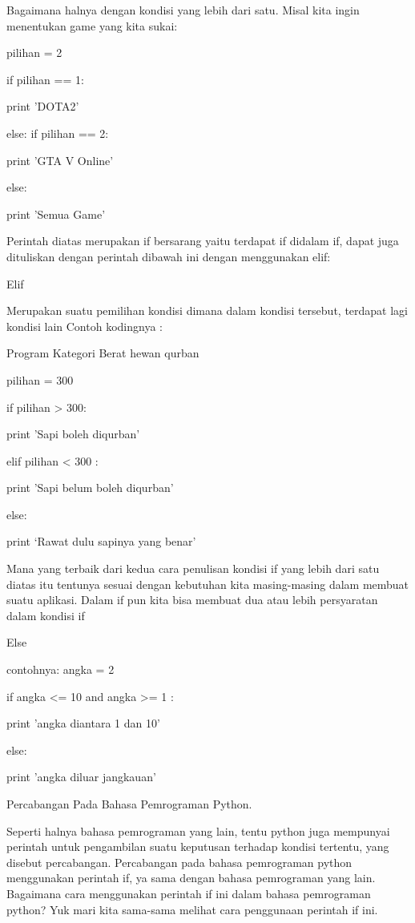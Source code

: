 Bagaimana halnya dengan kondisi yang lebih dari satu. Misal kita ingin menentukan game yang kita sukai: 
 

pilihan = 2 
 

if pilihan == 1: 
 

        print 'DOTA2' 
 

else:
        if pilihan == 2: 
 

                print 'GTA V Online' 
 

        else: 
 

                print 'Semua Game' 
 

Perintah diatas merupakan if bersarang yaitu terdapat if didalam if, dapat juga dituliskan dengan perintah dibawah ini dengan menggunakan elif: 
 


Elif 
 

Merupakan suatu pemilihan kondisi dimana dalam kondisi tersebut, terdapat lagi kondisi lain
Contoh kodingnya : 
 

Program Kategori Berat hewan qurban 
 

pilihan = 300 
 

if pilihan > 300: 
 

        print 'Sapi boleh diqurban' 
 

elif pilihan <    300 : 
 

        print 'Sapi belum boleh diqurban' 
 

else: 
 

        print ‘Rawat dulu sapinya yang benar' 
 

Mana yang terbaik dari kedua cara penulisan kondisi if yang lebih dari satu diatas itu tentunya sesuai dengan kebutuhan kita masing-masing dalam membuat suatu aplikasi. Dalam if pun kita bisa membuat dua atau lebih persyaratan dalam kondisi if 
 


Else 
 

contohnya:
angka = 2 
 

if angka <= 10 and angka >= 1 : 
 

        print 'angka diantara 1 dan 10' 
 

else: 
 

        print 'angka diluar jangkauan' 

 
Percabangan Pada Bahasa Pemrograman Python. 

 
Seperti halnya bahasa pemrograman yang lain, tentu python juga mempunyai perintah untuk pengambilan suatu keputusan terhadap kondisi tertentu, yang disebut percabangan. Percabangan pada bahasa pemrograman python menggunakan perintah   if, ya sama dengan bahasa pemrograman yang lain. Bagaimana cara menggunakan perintah   if   ini dalam bahasa pemrograman python? Yuk mari kita sama-sama melihat cara penggunaan perintah   if   ini. 

